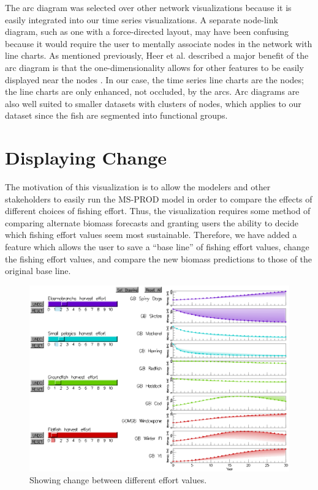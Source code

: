 The arc diagram was selected over other network visualizations because it is easily integrated into our time series visualizations.  A separate node-link diagram, such as one with a force-directed layout, may have been confusing because it would require the user to mentally associate nodes in the network with line charts.  As mentioned previously, Heer et al. described a major benefit of the arc diagram is that the one-dimensionality allows for other features to be easily displayed near the nodes \cite{heer2010}.  In our case, the time series line charts are the nodes; the line charts are only enhanced, not occluded, by the arcs.  Arc diagrams are also well suited to smaller datasets with clusters of nodes, which applies to our dataset since the fish are segmented into functional groups.

\section{Displaying Change}

The motivation of this visualization is to allow the modelers and other stakeholders to easily run the MS-PROD model in order to compare the effects of different choices of fishing effort.  Thus, the visualization requires some method of comparing alternate biomass forecasts and granting users the ability to decide which fishing effort values seem most sustainable.  Therefore, we have added a feature which allows the user to save a ``base line'' of fishing effort values, change the fishing effort values, and compare the new biomass predictions to those of the original base line.

\begin{figure}[h]
	\centering
	\includegraphics[width=12cm]{figures/eps/msprod_change.eps}
	\caption{Showing change between different effort values.}
	\label{fig:msprod_change}
\end{figure}

